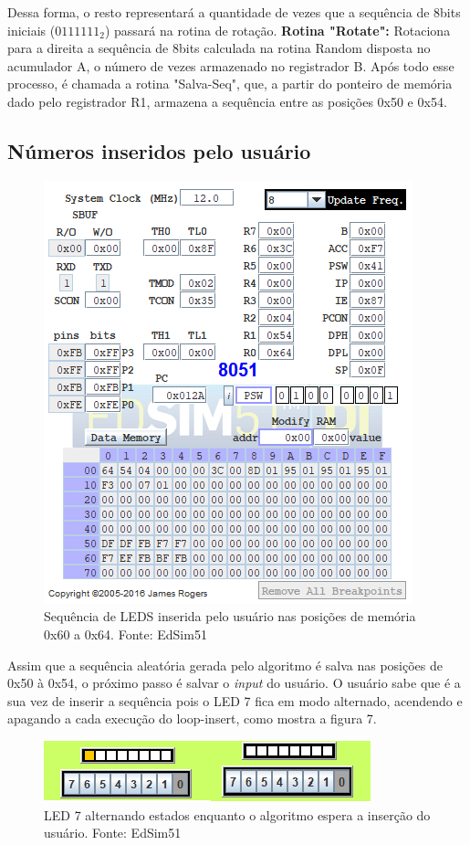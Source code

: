 \documentclass{article}
\begin{document}
Dessa forma, o resto representará a quantidade de vezes que a sequência de 8bits iniciais ($0111111_{2}$) passará na rotina de rotação.\newline
\textbf{Rotina "Rotate":} Rotaciona para a direita a sequência de 8bits calculada na rotina Random disposta no acumulador A, o número de vezes armazenado no registrador B.\newline
Após todo esse processo, é chamada a rotina "Salva-Seq", que, a partir do ponteiro de memória dado pelo registrador R1, armazena a sequência entre as posições 0x50 e 0x54.

\subsection{Números inseridos pelo usuário}
\begin{figure}[H]
\includegraphics[scale=1]{sequsuario.PNG}
\caption{Sequência de LEDS inserida pelo usuário nas posições de memória 0x60 a 0x64. Fonte: EdSim51}
\end{figure}
Assim que a sequência aleatória gerada pelo algoritmo é salva nas posições de 0x50 à 0x54, o próximo passo é salvar o \textit{input} do usuário.\newline
O usuário sabe que é a sua vez de inserir a sequência pois o LED 7 fica em modo alternado, acendendo e apagando a cada execução do loop-insert, como mostra a figura 7.
\begin{figure}[H]
\centering
\includegraphics[scale=1]{piscapisca.png}
\caption{LED 7 alternando estados enquanto o algoritmo espera a inserção do usuário. Fonte: EdSim51}
\end{figure}
\end{document}
